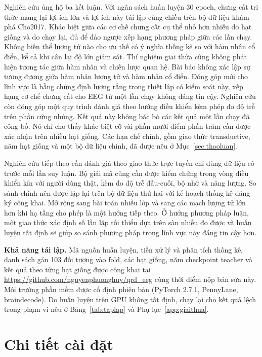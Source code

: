Nghiên cứu ủng hộ ba kết luận. Với ngân sách huấn luyện 30 epoch, chưng cất
tri thức mang lại lợi ích lớn và lợi ích này tái lập cùng chiều trên bộ dữ
liệu khám phá Cho2017. Khác biệt giữa các cơ chế chưng cất cụ thể nhỏ hơn
nhiễu do hạt giống và do chạy lại, đủ để đảo ngược xếp hạng phương pháp
giữa các lần chạy. Không biến thể lượng tử nào cho ưu thế có ý nghĩa thống
kê so với hàm nhân cổ điển, kể cả khi cân lại độ lớn giám sát. Thí nghiệm giai thừa cũng không phát hiện
tương tác giữa hàm nhân và chiến lược quan hệ. Bài báo không xác lập sự tương
đương giữa hàm nhân lượng tử và hàm nhân cổ điển. Đóng góp mới cho lĩnh vực
là bằng chứng định lượng rằng trong thiết lập có kiểm soát này, xếp hạng cơ
chế chưng cất cho EEG từ một lần chạy không đáng tin cậy. Nghiên cứu còn đóng
góp một quy trình đánh giá theo hướng điều khiển kèm phép đo độ trễ trên phần
cứng nhúng. Kết quả này không bác bỏ các kết quả một lần chạy đã công bố. Nó chỉ
cho thấy khác biệt cỡ vài phần mười điểm phần trăm cần được xác nhận trên
nhiều hạt giống. Các hạn chế chính, gồm giao thức
transductive, năm hạt giống và một bộ dữ liệu chính, đã được nêu ở
Mục~\ref{sec:thaoluan}.

Nghiên cứu tiếp theo cần đánh giá theo giao thức trực tuyến chỉ dùng dữ liệu
có trước mỗi lần suy luận. Bộ giải mã cũng cần được kiểm chứng trong vòng
điều khiển kín với người dùng thật, kèm đo độ trễ đầu-cuối, bộ nhớ và năng
lượng. So sánh chính nên được lặp lại trên bộ dữ liệu thứ hai với kế hoạch
thống kê đăng ký công khai. Mở rộng sang bài toán nhiều lớp và sang các mạch
lượng tử lớn hơn khi hạ tầng cho phép là một hướng tiếp theo. Ở hướng phương pháp luận, một
giao thức xác định số lần lặp tối thiểu dựa trên sàn nhiễu đo được và huấn
luyện tất định sẽ giúp so sánh phương pháp trong lĩnh vực này đáng tin cậy
hơn.

\textbf{Khả năng tái lập.} Mã nguồn huấn luyện, tiền xử lý và phân tích
thống kê, danh sách gán 103 đối tượng vào fold, các hạt giống, năm checkpoint
teacher và kết quả theo từng hạt giống được công khai tại
\url{https://github.com/nguyenphuonghuy/qrd_eeg} cùng thời điểm nộp bản
sửa này. Môi trường phần mềm được cố định phiên bản (PyTorch 2.7.1,
PennyLane, braindecode). Do huấn luyện trên GPU không tất định, chạy lại
cho kết quả lệch trong phạm vi nêu ở Bảng~\ref{tab:taplap} và
Phụ lục~\ref{app:giaithua}.

\appendix

\section{Chi tiết cài đặt}
\label{app:caidat}

